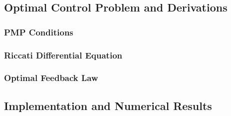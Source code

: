 \subsection{Optimal Control Problem and Derivations}
\label{subsec:lqr_derivations}


\subsubsection{PMP Conditions}
\label{subsubsec:lqr_pmp}


\subsubsection{Riccati Differential Equation}
\label{subsubsec:lqr_riccati}


\subsubsection{Optimal Feedback Law}
\label{subsubsec:lqr_feedback}


\subsection{Implementation and Numerical Results}
\label{subsec:lqr_implementation_results}

